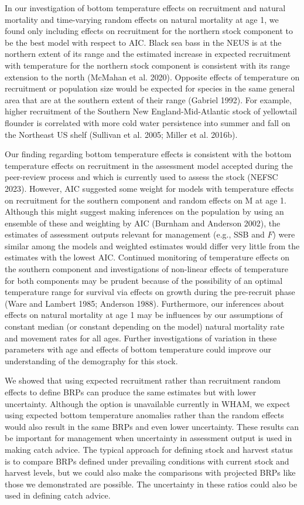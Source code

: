 \documentclass[
]{article}
\begin{document}
In our investigation of bottom temperature effects on recruitment and natural mortality and time-varying random effects on natural mortality at age 1, we found only including effects on recruitment for the northern stock component to be the best model with respect to AIC. Black sea bass in the NEUS is at the northern extent of its range and the estimated increase in expected recruitment with temperature for the northern stock component is consistent with its range extension to the north (McMahan et al. 2020). Opposite effects of temperature on recruitment or population size would be expected for species in the same general area that are at the southern extent of their range (Gabriel 1992). For example, higher recruitment of the Southern New England-Mid-Atlantic stock of yellowtail flounder is correlated with more cold water persistence into summer and fall on the Northeast US shelf (Sullivan et al. 2005; Miller et al. 2016b).

Our finding regarding bottom temperature effects is consistent with the bottom temperature effects on recruitment in the assessment model accepted during the peer-review process and which is currently used to assess the stock (NEFSC 2023). However, AIC suggested some weight for models with temperature effects on recruitment for the southern component and random effects on M at age 1. Although this might suggest making inferences on the population by using an ensemble of these and weighting by AIC (Burnham and Anderson 2002), the estimates of assessment outputs relevant for management (e.g., SSB and \(F\)) were similar among the models and weighted estimates would differ very little from the estimates with the lowest AIC. Continued monitoring of temperature effects on the southern component and investigations of non-linear effects of temperature for both components may be prudent because of the possibility of an optimal temperature range for survival via effects on growth during the pre-recruit phase (Ware and Lambert 1985; Anderson 1988). Furthermore, our inferences about effects on natural mortality at age 1 may be influences by our assumptions of constant median (or constant depending on the model) natural mortality rate and movement rates for all ages. Further investigations of variation in these parameters with age and effects of bottom temperature could improve our understanding of the demography for this stock.

We showed that using expected recruitment rather than recruitment random effects to define BRPs can produce the same estimates but with lower uncertainty. Although the option is unavailable currently in WHAM, we expect using expected bottom temperature anomalies rather than the random effects would also result in the same BRPs and even lower uncertainty. These results can be important for management when uncertainty in assessment output is used in making catch advice. The typical approach for defining stock and harvest status is to compare BRPs defined under prevailing conditions with current stock and harvest levels, but we could also make the comparisons with projected BRPs like those we demonstrated are possible. The uncertainty in these ratios could also be used in defining catch advice.
\end{document}
